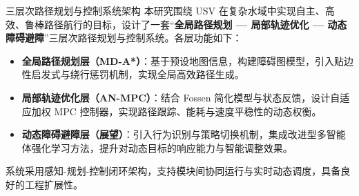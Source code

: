 

\begin{frame}{三层次路径规划与控制系统架构}
    \justifying
    本研究围绕 USV 在复杂水域中实现自主、高效、鲁棒路径航行的目标，设计了一套“\textbf{全局路径规划 — 局部轨迹优化 — 动态障碍避障}”三层次路径规划与控制系统。各层功能如下：
    
    \vspace{0.2em}
    \begin{itemize}
      \item \textbf{全局路径规划层（MD-A*）}：基于预设地图信息，构建障碍图模型，引入贴边性启发式与绕行惩罚机制，实现全局高效路径生成。
      
      \item \textbf{局部轨迹优化层（AN-MPC）}：结合 Fossen 简化模型与状态反馈，设计自适应加权 MPC 控制器，实现路径跟踪、能耗与速度平稳性的动态权衡。
      
      \item \textbf{动态障碍避障层（展望）}：引入行为识别与策略切换机制，集成改进型多智能体强化学习方法，提升对动态目标的响应能力与智能调整效果。
    \end{itemize}
    
    \vspace{0.2em}
    系统采用感知-规划-控制闭环架构，支持模块间协同运行与实时动态调度，具备良好的工程扩展性。
    \end{frame}
    